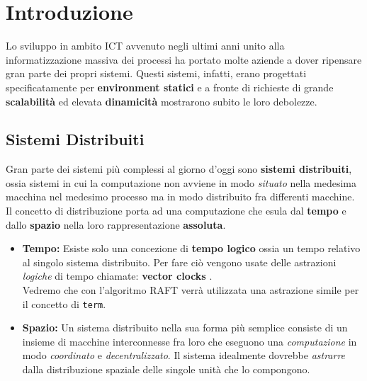 \chapter{Introduzione}
	Lo sviluppo in ambito ICT avvenuto negli ultimi anni unito alla informatizzazione massiva dei processi ha portato molte aziende a dover ripensare gran parte dei propri sistemi. Questi sistemi, infatti, erano progettati specificatamente per \textbf{environment statici} e a fronte di richieste di grande \textbf{scalabilità} ed elevata \textbf{dinamicità} mostrarono subito le loro debolezze.

	\section{Sistemi Distribuiti}
	Gran parte dei sistemi più complessi al giorno d'oggi sono \textbf{sistemi distribuiti}, ossia sistemi in cui la computazione non avviene in modo \textit{situato} nella medesima macchina nel medesimo processo ma in modo distribuito fra differenti macchine. Il concetto di distribuzione porta ad una computazione che esula dal \textbf{tempo} e dallo \textbf{spazio} nella loro rappresentazione \textbf{assoluta}.
	\begin{itemize}
		\item{\textbf{Tempo:}}
		Esiste solo una concezione di \textbf{tempo logico} ossia un tempo relativo al singolo sistema distribuito. Per fare ciò vengono usate delle astrazioni \textit{logiche} di tempo chiamate: \textbf{vector clocks} \cite[Lamport:1978]{Lamport:1978}.\\
		Vedremo che con l'algoritmo RAFT verrà utilizzata una astrazione simile per il concetto di \texttt{term}.
		\item{\textbf{Spazio:}}
		Un sistema distribuito nella sua forma più semplice consiste di un insieme di macchine interconnesse fra loro che eseguono una \textit{computazione} in modo \textit{coordinato} e \textit{decentralizzato}. Il sistema idealmente dovrebbe \textit{astrarre} dalla distribuzione spaziale delle singole unità che lo compongono.
	\end{itemize}

